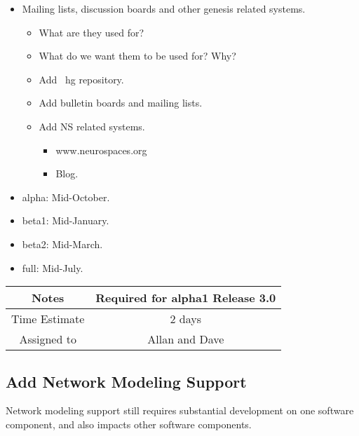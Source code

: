 \documentclass[12pt]{article}
\begin{document}
\begin{itemize}
\begin{itemize}
\begin{itemize}
    \end{itemize}
  \item Mailing lists, discussion boards and other genesis related systems.
    \begin{itemize}
    \item What are they used for?
    \item What do we want them to be used for? Why?
    \item Add {\ hg} repository.
    \item Add bulletin boards and mailing lists.
    \item Add NS related systems.
      \begin{itemize}
      \item www.neurospaces.org
      \item Blog.
      \end{itemize}
    \end{itemize}
  \item alpha: Mid-October.
  \item beta1: Mid-January.
  \item beta2: Mid-March.
  \item full: Mid-July.
  \end{itemize}
\end{itemize}

{
  \vspace{5mm}
  \centering
  \begin{tabular}{|c|c|}
    \hline
    Notes
    & Required for alpha1 Release 3.0 \\
    \hline
    Time Estimate
    & 2 days \\
    \hline
    Assigned to
    & Allan and Dave \\
    \hline
  \end{tabular}
}


\subsection{Add Network Modeling Support}

Network modeling support still requires substantial development on one
software component, and also impacts other software components.
\end{document}

